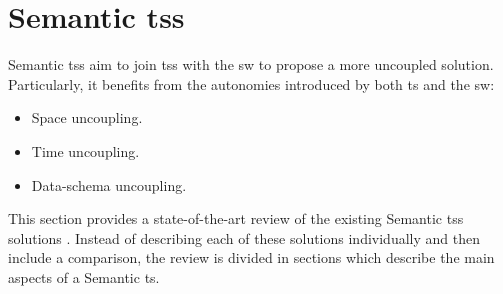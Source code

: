 \section{Semantic \aclp{ts}}
\label{sec:soa_tsc}


Semantic \aclp{ts} aim to join \aclp{ts} with the \acl{sw} to propose a more uncoupled solution.
Particularly, it benefits from the autonomies introduced by both \ac{ts} and the \ac{sw}:

\begin{itemize}
  \item Space uncoupling.
  \item Time uncoupling.
  \item Data-schema uncoupling. %
\end{itemize}


This section provides a state-of-the-art review of the existing Semantic \aclp{ts} solutions \citep{nixon_tuplespace-based_2008}.
Instead of describing each of these solutions individually and then include a comparison,
the review is divided in sections which describe the main aspects of a Semantic \ac{ts}.




\newcommand{\midtsc}{\acs{tsc} \citep{fensel_tsc_2007}}
\newcommand{\midsws}{\acs{sws} \citep{tolksdorf_coordination_2006}}
\newcommand{\midstuples}{\acs{stuples} \citep{khushraj_stuples:_2004}}
\newcommand{\midcspaces}{\acs{cspaces} \citep{martinrecuerda_towards_2005}}
\newcommand{\midtscpp}{tsc++ \citep{krummenacher_open_2009,blunder_distributed_2009}}
\newcommand{\midtripcom}{\acs{tripcom} \citep{simperl_coordination_2007}}
\newcommand{\midsmartmt}{Smart-M3 \citep{honkola_smart-m3_2010}}
\newcommand{\midnardini}{\citet{nardini_semantic_2013}}



